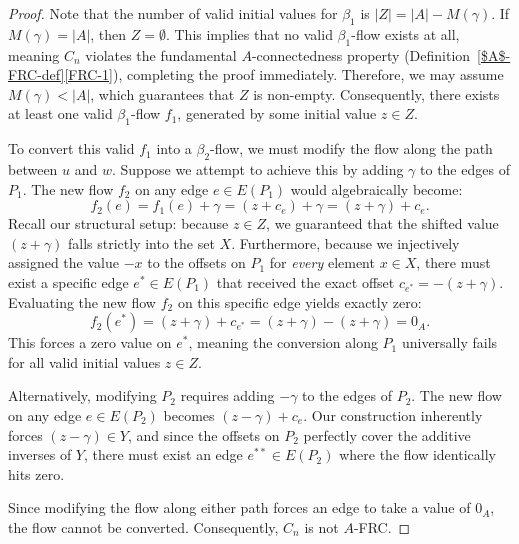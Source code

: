 \documentclass[a4paper,12pt]{article}
\theoremstyle{plain}
\theoremstyle{definition}
\begin{document}
\begin{proof}
Note that the number of valid initial values for $\beta_1$ is $|Z| = |A| - M(\gamma)$. If $M(\gamma) = |A|$, then $Z = \emptyset$. This implies that no valid $\beta_1$-flow exists at all, meaning $C_n$ violates the fundamental $A$-connectedness property (Definition~\ref{$A$-FRC-def}\ref{FRC-1}), completing the proof immediately. Therefore, we may assume $M(\gamma) < |A|$, which guarantees that $Z$ is non-empty. Consequently, there exists at least one valid $\beta_1$-flow $f_1$, generated by some initial value $z \in Z$.

To convert this valid $f_1$ into a $\beta_2$-flow, we must modify the flow along the path between $u$ and $w$. Suppose we attempt to achieve this by adding $\gamma$ to the edges of $P_1$. The new flow $f_2$ on any edge $e \in E(P_1)$ would algebraically become:
\[ f_2(e) = f_1(e) + \gamma = (z + c_e) + \gamma = (z + \gamma) + c_e. \]
Recall our structural setup: because $z \in Z$, we guaranteed that the shifted value $(z + \gamma)$ falls strictly into the set $X$. Furthermore, because we injectively assigned the value $-x$ to the offsets on $P_1$ for \textit{every} element $x \in X$, there must exist a specific edge $e^* \in E(P_1)$ that received the exact offset $c_{e^*} = -(z+\gamma)$. Evaluating the new flow $f_2$ on this specific edge yields exactly zero:
\[ f_2(e^*) = (z + \gamma) + c_{e^*} = (z + \gamma) - (z + \gamma) = 0_A. \]
This forces a zero value on $e^*$, meaning the conversion along $P_1$ universally fails for all valid initial values $z \in Z$.

Alternatively, modifying $P_2$ requires adding $-\gamma$ to the edges of $P_2$. The new flow on any edge $e \in E(P_2)$ becomes $(z - \gamma) + c_e$. Our construction inherently forces $(z - \gamma) \in Y$, and since the offsets on $P_2$ perfectly cover the additive inverses of $Y$, there must exist an edge $e^{**} \in E(P_2)$ where the flow identically hits zero. 

Since modifying the flow along either path forces an edge to take a value of $0_A$, the flow cannot be converted. Consequently, $C_n$ is not $A$-FRC.
\end{proof}
\end{document}
